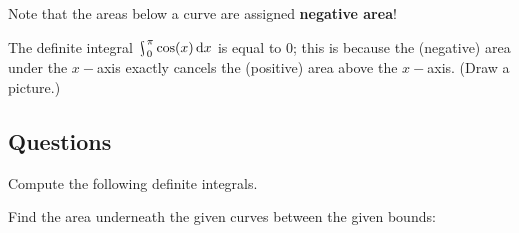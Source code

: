 Note that the areas below a curve are assigned \textbf{negative area}!

\begin{ex}
  The definite integral $ \rint^\pi_0 \cos(x) \dif{x} $ is equal to 0; this is because the (negative) area under the $ x-$axis exactly
  cancels the (positive) area above the $ x-$axis. (Draw a picture.)
\end{ex}

\subsection*{Questions}
\begin{questions}
  \questioA Compute the following definite integrals.
  \questioA Find the area underneath the given curves between the given bounds:
\end{questions}
